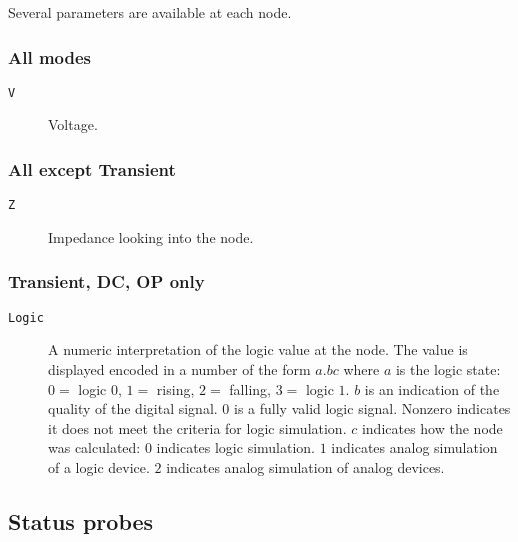 Several parameters are available at each node.
\subsubsection{All modes}

\begin{description}

\item[{\tt V}] Voltage.

\end{description}
\subsubsection{All except Transient}

\begin{description}

\item[{\tt Z}] Impedance looking into the node.

\end{description}
\subsubsection{Transient, DC, OP only}
\begin{description}

\item[{\tt Logic}] A numeric interpretation of the logic value at the node.
The value is displayed encoded in a number of the form $a.bc$ where $a$ is
the logic state: $0 =$ logic $0$, $1 =$ rising, $2 =$ falling, $3 =$ logic
$1$.  $b$ is an indication of the quality of the digital signal.  $0$ is a
fully valid logic signal.  Nonzero indicates it does not meet the criteria
for logic simulation.  $c$ indicates how the node was calculated:  $0$
indicates logic simulation.  $1$ indicates analog simulation of a logic
device.  $2$ indicates analog simulation of analog devices.

\end{description}
\subsection{Status probes}


